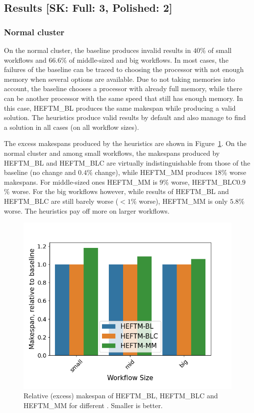 \documentclass[conference]{IEEEtran}
\newcommand{\algo}[1]{\textsc{#1}}
\newcommand{\heftmm}{\algo{HEFTM\_MM}\xspace}
\newcommand{\heftbl}{\algo{HEFTM\_BL}\xspace}
\newcommand{\heftblc}{\algo{HEFTM\_BLC}\xspace}
\newcommand{\skug}[1]{{\color{blue}[SK: #1]}}
\begin{document}
    \subsection{Results \skug{Full: 3, Polished: 2}}
    \subsubsection{Normal cluster}

    On the normal cluster, the baseline produces invalid results in $40$\% of small workflows and $66.6$\% of middle-sized
    and big workflows.
    In most cases, the failures of the baseline can be traced to choosing the processor with not enough memory when several
    options are available.
    Due to not taking memories into account, the baseline chooses a processor with already full memory, while there can
    be another processor with the same speed that still has enough memory.
    In this case, \heftbl produces the same makespan while producing a valid solution.
    The heuristics produce valid results by default and also manage to find a solution in all cases (on all workflow sizes).

    The excess makespans produced by the heuristics are shown in Figure~\ref{fig:excess-ms}.
    On the normal cluster and among small workflows, the makespans produced by \heftbl and \heftblc are virtually indistinguishable
    from those of the baseline (no change and $0.4$\% change), while \heftmm produces  $18$\% worse makespans.
    For middle-sized ones \heftmm is $9$\% worse,  \heftblc $0.9$\% worse.
    For the big workflows however, while results of \heftbl and \heftblc are still barely worse ($<1$\% worse),
     \heftmm is only $5.8$\% worse.
    The heuristics pay off more on larger workflows.

    \begin{figure}[tb]
        \centering
        \includegraphics[width=0.495\columnwidth] {images/ms-relative-3groups}
        \caption{Relative (excess) makespan of \heftbl, \heftblc and \heftmm for different . Smaller is better.}
       \label{fig:excess-ms}
        \vspace{-0.3cm}
    \end{figure}
\end{document}

